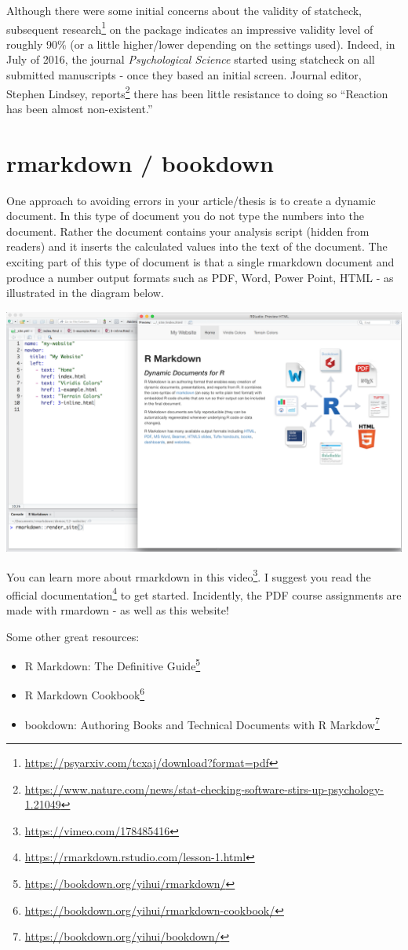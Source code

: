 \documentclass[
]{krantz}
\renewcommand{\href}[2]{#2\footnote{\url{#1}}}
\begin{document}
Although there were some initial concerns about the validity of statcheck, subsequent \href{https://psyarxiv.com/tcxaj/download?format=pdf}{research} on the package indicates an impressive validity level of roughly 90\% (or a little higher/lower depending on the settings used). Indeed, in July of 2016, the journal \emph{Psychological Science} started using statcheck on all submitted manuscripts - once they based an initial screen. Journal editor, Stephen Lindsey, \href{https://www.nature.com/news/stat-checking-software-stirs-up-psychology-1.21049}{reports} there has been little resistance to doing so ``Reaction has been almost non-existent.''

\hypertarget{rmarkdown-bookdown}{%
\section{rmarkdown / bookdown}\label{rmarkdown-bookdown}}

One approach to avoiding errors in your article/thesis is to create a dynamic document. In this type of document you do not type the numbers into the document. Rather the document contains your analysis script (hidden from readers) and it inserts the calculated values into the text of the document. The exciting part of this type of document is that a single rmarkdown document and produce a number output formats such as PDF, Word, Power Point, HTML - as illustrated in the diagram below.

\includegraphics[width=0.6\linewidth]{ch_tools/images/rmarkdown_docs}

You can learn more about rmarkdown in this \href{https://vimeo.com/178485416}{video}. I suggest you read the official \href{https://rmarkdown.rstudio.com/lesson-1.html}{documentation} to get started. Incidently, the PDF course assignments are made with rmardown - as well as this website!

Some other great resources:

\begin{itemize}
\item
  \href{https://bookdown.org/yihui/rmarkdown/}{R Markdown: The Definitive Guide}
\item
  \href{https://bookdown.org/yihui/rmarkdown-cookbook/}{R Markdown Cookbook}
\item
  \href{https://bookdown.org/yihui/bookdown/}{bookdown: Authoring Books and Technical Documents with R Markdow}
\end{itemize}
\end{document}
